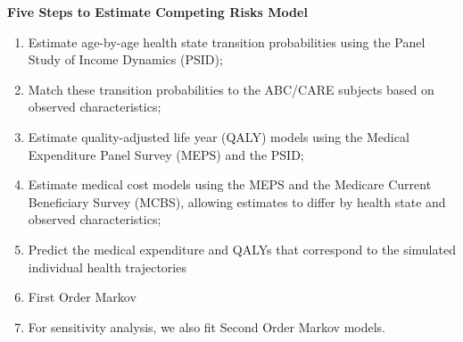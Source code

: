 \documentclass[static]{JJH-Beamer}
\begin{document}
\begin{frame}

\begin{center}
\textbf{Five Steps to Estimate Competing Risks Model}
\end{center}

\begin{enumerate}[(1)]
\item Estimate age-by-age health state transition probabilities using the Panel Study of Income Dynamics (PSID);
\item Match these transition probabilities to the ABC/CARE subjects based on observed characteristics;
\item Estimate quality-adjusted life year (QALY) models using the Medical Expenditure Panel Survey (MEPS) and the PSID;
\item Estimate medical cost models using the MEPS and the Medicare Current Beneficiary Survey (MCBS), allowing estimates to differ by health state and observed characteristics;
\item Predict the medical expenditure and QALYs that correspond to the simulated individual health trajectories
\item First Order Markov
\item For sensitivity analysis, we also fit Second Order Markov models.
\end{enumerate}

\end{frame}
\end{document}
